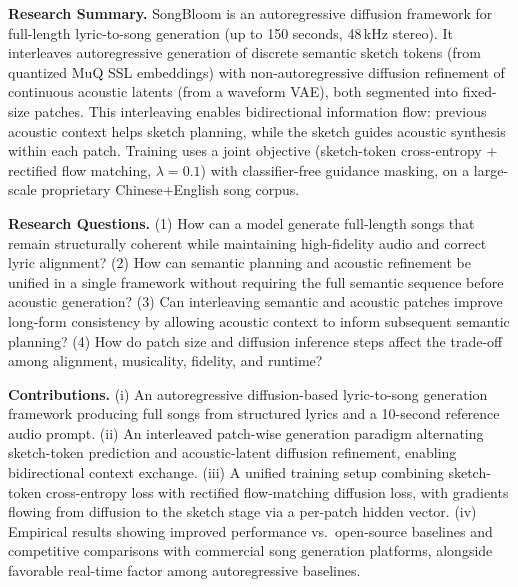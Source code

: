 \begin{tcolorbox}[
	title={Box 13: Case 2 --- Research Task Overview (Input)},
	colback=red!3!white,
	colframe=red!30!black,
	colbacktitle=red!15!white,
	coltitle=black,
	fonttitle=\bfseries,
	arc=3mm,
	boxrule=0.8pt,
	breakable
]
\small
\textbf{Research Summary.} SongBloom is an autoregressive diffusion framework for full-length lyric-to-song generation (up to 150 seconds, 48\,kHz stereo). It interleaves autoregressive generation of discrete semantic sketch tokens (from quantized MuQ SSL embeddings) with non-autoregressive diffusion refinement of continuous acoustic latents (from a waveform VAE), both segmented into fixed-size patches. This interleaving enables bidirectional information flow: previous acoustic context helps sketch planning, while the sketch guides acoustic synthesis within each patch. Training uses a joint objective (sketch-token cross-entropy + rectified flow matching, $\lambda=0.1$) with classifier-free guidance masking, on a large-scale proprietary Chinese+English song corpus.

\smallskip
\textbf{Research Questions.} (1) How can a model generate full-length songs that remain structurally coherent while maintaining high-fidelity audio and correct lyric alignment? (2) How can semantic planning and acoustic refinement be unified in a single framework without requiring the full semantic sequence before acoustic generation? (3) Can interleaving semantic and acoustic patches improve long-form consistency by allowing acoustic context to inform subsequent semantic planning? (4) How do patch size and diffusion inference steps affect the trade-off among alignment, musicality, fidelity, and runtime?

\smallskip
\textbf{Contributions.} (i) An autoregressive diffusion-based lyric-to-song generation framework producing full songs from structured lyrics and a 10-second reference audio prompt. (ii) An interleaved patch-wise generation paradigm alternating sketch-token prediction and acoustic-latent diffusion refinement, enabling bidirectional context exchange. (iii) A unified training setup combining sketch-token cross-entropy loss with rectified flow-matching diffusion loss, with gradients flowing from diffusion to the sketch stage via a per-patch hidden vector. (iv) Empirical results showing improved performance vs.\ open-source baselines and competitive comparisons with commercial song generation platforms, alongside favorable real-time factor among autoregressive baselines.


\end{tcolorbox}
